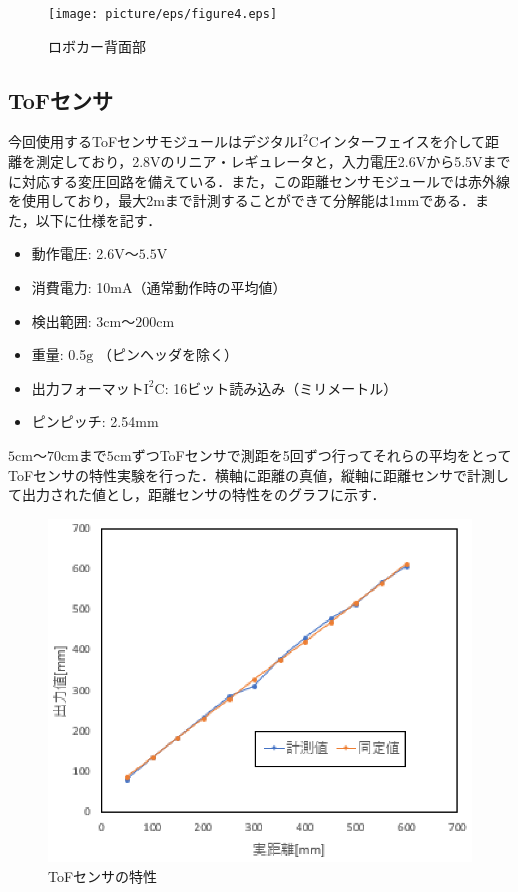 \begin{figure}[htb]
 \centering
  \texttt{[image: picture/eps/figure4.eps]}
  \caption{ロボカー背面部}
  \label{fig::figure4}
\end{figure}

\newpage
\subsection{ToFセンサ}
今回使用するToFセンサモジュールはデジタル$\mathrm{I^{2}C}$インターフェイスを介して距離を測定しており，2.8$\mathrm{V}$のリニア・レギュレータと，入力電圧2.6$\mathrm{V}$から5.5$\mathrm{V}$までに対応する変圧回路を備えている．また，この距離センサモジュールでは赤外線を使用しており，最大2$\mathrm{m}$まで計測することができて分解能は1$\mathrm{mm}$である．また，以下に仕様を記す\cite{tof_sensor1}．
\begin{itemize}
 \item 動作電圧: 2.6$\mathrm{V}〜5.5\mathrm{V}$
 \item 消費電力: 10$\mathrm{mA}$（通常動作時の平均値）
 \item 検出範囲: 3$\mathrm{cm}〜200\mathrm{cm}$
 \item 重量: 0.5$\mathrm{g}$ （ピンヘッダを除く）
 \item 出力フォーマット$\mathrm{I^{2}C}$: 16ビット読み込み（ミリメートル）
 \item ピンピッチ: 2.54$\mathrm{mm}$ 
\end{itemize}

$\mathrm{5cm}〜\mathrm{70cm}$まで$\mathrm{5cm}$ずつToFセンサで測距を5回ずつ行ってそれらの平均をとってToFセンサの特性実験を行った．横軸に距離の真値，縦軸に距離センサで計測して出力された値とし，距離センサの特性をのグラフに示す．

\begin{figure}[htb]
  \centering
  \includegraphics[width=0.5\hsize]{picture/eps/graph.eps}
  \caption{ToFセンサの特性}
  \label{fig::tof_graph}
 \end{figure}

